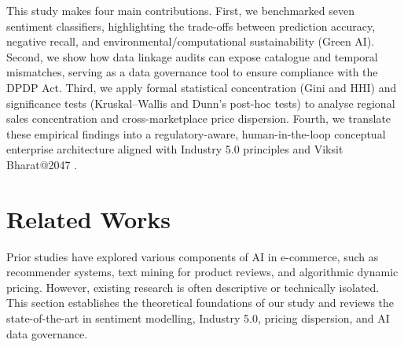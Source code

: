 \documentclass[authoryear,review,3p,times,12pt]{elsarticle}
\begin{document}
This study makes four main contributions. First, we benchmarked seven sentiment classifiers, highlighting the trade-offs between prediction accuracy, negative recall, and environmental/computational sustainability (Green AI). Second, we show how data linkage audits can expose catalogue and temporal mismatches, serving as a data governance tool to ensure compliance with the DPDP Act. Third, we apply formal statistical concentration (Gini and HHI) and significance tests (Kruskal–Wallis and Dunn's post-hoc tests) to analyse regional sales concentration and cross-marketplace price dispersion. Fourth, we translate these empirical findings into a regulatory-aware, human-in-the-loop conceptual enterprise architecture aligned with Industry 5.0 principles and Viksit Bharat@2047 \citep{nitiaayog2026dpi}.

\section{Related Works}
\label{sec:related}
Prior studies have explored various components of AI in e-commerce, such as recommender systems, text mining for product reviews, and algorithmic dynamic pricing. However, existing research is often descriptive or technically isolated. This section establishes the theoretical foundations of our study and reviews the state-of-the-art in sentiment modelling, Industry 5.0, pricing dispersion, and AI data governance.
\end{document}
